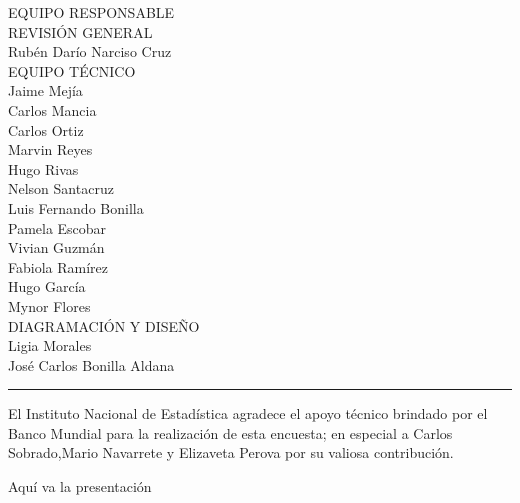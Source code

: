$\ $
\vspace{1cm}

\begin{center}
	{\Bold \LARGE EQUIPO RESPONSABLE}\\[2cm]
	
	{\Bold \large \color{color1!89!black} REVISIÓN GENERAL}\\[0.2cm]
	Rubén Darío Narciso Cruz\\[0.8cm]
	
	
	{\Bold \large \color{color1!89!black} EQUIPO TÉCNICO}\\[0.2cm]
	Jaime Mejía\\
	Carlos Mancia\\
	Carlos Ortiz\\
	Marvin Reyes\\
	Hugo Rivas\\
	Nelson Santacruz \\
	Luis Fernando Bonilla\\
	Pamela Escobar\\
	Vivian Guzmán\\
	Fabiola Ramírez \\
	Hugo García \\
	Mynor Flores \\[0.8cm]
	
{\Bold \large \color{color1!89!black} DIAGRAMACIÓN Y DISEÑO}\\[0.2cm]
Ligia Morales\\
José Carlos Bonilla Aldana
\end{center}
\vfill
\hrule 
El Instituto Nacional de Estadística agradece el apoyo técnico brindado por el Banco Mundial para la realización de esta encuesta; en especial a Carlos Sobrado,Mario Navarrete y  Elizaveta Perova por su valiosa contribución. 
\cleardoublepage
$\ $\\[2cm]

Aquí va la presentación
\cleardoublepage
